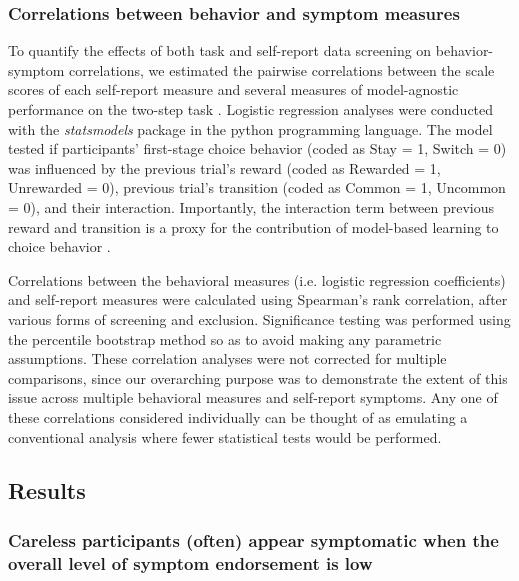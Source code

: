 \documentclass[a4paper,notitlepage,12pt]{article}
\begin{document}
\begin{refsection}[supp]
\subsubsection*{Correlations between behavior and symptom measures}

To quantify the effects of both task and self-report data screening on behavior-symptom correlations, we estimated the pairwise correlations between the scale scores of each self-report measure and several measures of model-agnostic performance on the two-step task \cite{gillan2016characterizing}. Logistic regression analyses were conducted with the \textit{statsmodels} package \cite{seabold2010statsmodels} in the python programming language. The model tested if participants' first-stage choice behavior (coded as Stay = 1, Switch = 0) was influenced by the previous trial's reward (coded as Rewarded = 1, Unrewarded = 0), previous trial's transition (coded as Common = 1, Uncommon = 0), and their interaction. Importantly, the interaction term between previous reward and transition is a proxy for the contribution of model-based learning to choice behavior \cite{gillan2016characterizing}.

Correlations between the behavioral measures (i.e. logistic regression coefficients) and self-report measures were calculated using Spearman's rank correlation, after various forms of screening and exclusion. Significance testing was performed using the percentile bootstrap method \cite{wilcox2018guide-2} so as to avoid making any parametric assumptions. These correlation analyses were not corrected for multiple comparisons, since our overarching purpose was to demonstrate the extent of this issue across multiple behavioral measures and self-report symptoms. Any one of these correlations considered individually can be thought of as emulating a conventional analysis where fewer statistical tests would be performed.

\subsection*{Results}

\subsubsection*{Careless participants (often) appear symptomatic when the overall level of symptom endorsement is low}


\end{refsection}
\end{document}
